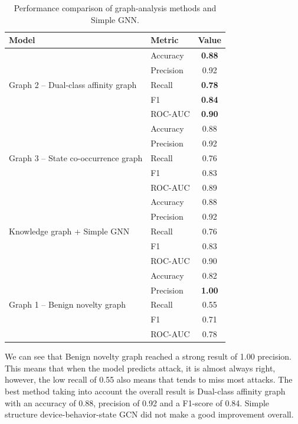 \documentclass[final,5p,times,twocolumn]{elsarticle}
\begin{document}
\begin{table}[H]
\caption{Performance comparison of graph-analysis methods and Simple GNN.}
\centering
\scriptsize
\renewcommand{\arraystretch}{1.15}
\begin{tabular}{llc}
\toprule
\textbf{Model} & \textbf{Metric} & \textbf{Value} \\
\midrule

\multirow{5}{*}{Graph 2 -- Dual-class affinity graph}
& Accuracy & \textbf{0.88} \\
& Precision & 0.92 \\
& Recall & \textbf{0.78} \\
& F1 & \textbf{0.84} \\
& ROC-AUC & \textbf{0.90} \\
\midrule

\multirow{5}{*}{Graph 3 -- State co-occurrence graph}
& Accuracy & 0.88 \\
& Precision & 0.92 \\
& Recall & 0.76 \\
& F1 & 0.83 \\
& ROC-AUC & 0.89 \\
\midrule

\multirow{5}{*}{Knowledge graph + Simple GNN}
& Accuracy & 0.88 \\
& Precision & 0.92 \\
& Recall & 0.76 \\
& F1 & 0.83 \\
& ROC-AUC & 0.90 \\
\midrule

\multirow{5}{*}{Graph 1 -- Benign novelty graph}
& Accuracy & 0.82 \\
& Precision & \textbf{1.00} \\
& Recall & 0.55 \\
& F1 & 0.71 \\
& ROC-AUC & 0.78 \\
\bottomrule

\end{tabular}
\label{tab:graph_analysis_gnn_performance_vertical}
\end{table}

We can see that Benign novelty graph reached a strong result of 1.00 precision. This means that when the model predicts attack, it is almost always right, however, the low recall of 0.55 also means that tends to miss most attacks. The best method taking into account the overall result is Dual-class affinity graph with an accuracy of 0.88, precision of 0.92 and a F1-score of 0.84. Simple structure device-behavior-state GCN did not make a good improvement overall.
\end{document}
